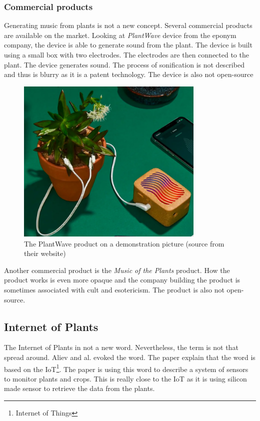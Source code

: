 \subsubsection{Commercial products}

Generating music from plants is not a new concept. Several commercial products are available on the market.
Looking at \textit{PlantWave} device from the eponym company, the device is able to generate sound from the plant. The device is
built using a small box with two electrodes. The electrodes are then connected to the plant. The device generates sound.
The process of sonification is not described and thus is blurry as it is a patent technology. The device is also not open-source

\begin{figure}[h!]
    \centering
    \includegraphics[width=0.8\textwidth]{images/plant_wave_product.png}
    \caption{The PlantWave product on a demonstration picture (source from their website)} 
    \vspace{0.1cm}
    \label{fig:plant_wave_product}
\end{figure}

Another commercial product is the \textit{Music of the Plants} product. How the product works is even more opaque and the company building the product
is sometimes associated with cult and esotericism. The product is also not open-source.


\subsection{Internet of Plants}

The Internet of Plants in not a new word. Nevertheless, the term is not that spread around.
Aliev and al. \cite{alievInternetPlantsApplication2018} evoked the word. The paper explain that
the word is based on the IoT\footnote{Internet of Things}. The paper is using this word 
to describe a system of sensors to monitor plants and crops. This is really close to the IoT
as it is using silicon made sensor to retrieve the data from the plants.

